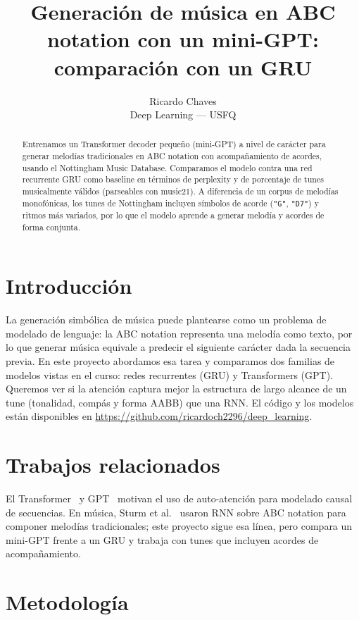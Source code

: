 \documentclass[twocolumn]{article}
\title{\textbf{Generación de música en ABC notation con un mini-GPT:}\\ \textbf{comparación con un GRU}}
\author{Ricardo Chaves \\ Deep Learning --- USFQ}
\date{}
\begin{document}
\maketitle

\begin{abstract}
Entrenamos un Transformer decoder pequeño (mini-GPT) a nivel de carácter para
generar melodías tradicionales en ABC notation con acompañamiento de acordes, usando el
Nottingham Music Database. Comparamos el modelo contra una red recurrente
GRU como baseline en términos de perplexity y de porcentaje de tunes
musicalmente válidos (parseables con music21). A diferencia de un corpus de
melodías monofónicas, los tunes de Nottingham incluyen símbolos de acorde
(\texttt{"G"}, \texttt{"D7"}) y ritmos más variados, por lo que el modelo aprende
a generar melodía y acordes de forma conjunta.
\end{abstract}

\section{Introducción}
La generación simbólica de música puede plantearse como un problema de modelado
de lenguaje: la ABC notation representa una melodía como texto, por lo que
generar música equivale a predecir el siguiente carácter dada la secuencia
previa. En este proyecto abordamos esa tarea y comparamos dos familias de modelos
vistas en el curso: redes recurrentes (GRU) y Transformers (GPT). Queremos ver
si la atención captura mejor la estructura de largo alcance de un tune
(tonalidad, compás y forma AABB) que una RNN. El código y los modelos están
disponibles en \url{https://github.com/ricardoch2296/deep_learning}.

\section{Trabajos relacionados}
El Transformer~\cite{vaswani2017attention} y GPT~\cite{radford2019language}
motivan el uso de auto-atención para modelado causal de secuencias. En música,
Sturm et al.~\cite{sturm2016music} usaron RNN sobre ABC notation para componer
melodías tradicionales; este proyecto sigue esa línea, pero compara un mini-GPT
frente a un GRU y trabaja con tunes que incluyen acordes de acompañamiento.

\section{Metodología}
\end{document}
